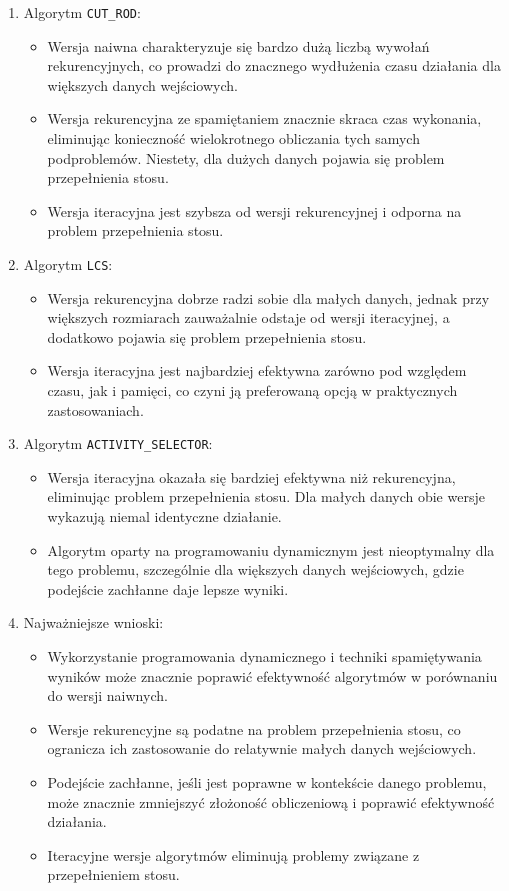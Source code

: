 \documentclass{article}
\begin{document}
\begin{enumerate}
    \item Algorytm \texttt{CUT\_ROD}:
    \begin{itemize}
        \item Wersja naiwna charakteryzuje się bardzo dużą liczbą wywołań rekurencyjnych, co prowadzi do znacznego wydłużenia czasu działania dla większych danych wejściowych.
        \item Wersja rekurencyjna ze spamiętaniem znacznie skraca czas wykonania, eliminując konieczność wielokrotnego obliczania tych samych podproblemów. Niestety, dla dużych danych pojawia się problem przepełnienia stosu.
        \item Wersja iteracyjna jest szybsza od wersji rekurencyjnej i odporna na problem przepełnienia stosu.
    \end{itemize}

    \item Algorytm \texttt{LCS}:
    \begin{itemize}
        \item Wersja rekurencyjna dobrze radzi sobie dla małych danych, jednak przy większych rozmiarach zauważalnie odstaje od wersji iteracyjnej, a dodatkowo pojawia się problem przepełnienia stosu.
        \item Wersja iteracyjna jest najbardziej efektywna zarówno pod względem czasu, jak i pamięci, co czyni ją preferowaną opcją w praktycznych zastosowaniach.
    \end{itemize}

    \item Algorytm \texttt{ACTIVITY\_SELECTOR}:
    \begin{itemize}
        \item Wersja iteracyjna okazała się bardziej efektywna niż rekurencyjna, eliminując problem przepełnienia stosu. Dla małych danych obie wersje wykazują niemal identyczne działanie.
        \item Algorytm oparty na programowaniu dynamicznym jest nieoptymalny dla tego problemu, szczególnie dla większych danych wejściowych, gdzie podejście zachłanne daje lepsze wyniki.
    \end{itemize}

    \item Najważniejsze wnioski:
    \begin{itemize}
        \item Wykorzystanie programowania dynamicznego i techniki spamiętywania wyników może znacznie poprawić efektywność algorytmów w porównaniu do wersji naiwnych.
        \item Wersje rekurencyjne są podatne na problem przepełnienia stosu, co ogranicza ich zastosowanie do relatywnie małych danych wejściowych.
        \item Podejście zachłanne, jeśli jest poprawne w kontekście danego problemu, może znacznie zmniejszyć złożoność obliczeniową i poprawić efektywność działania.
        \item Iteracyjne wersje algorytmów eliminują problemy związane z przepełnieniem stosu.
    \end{itemize}
\end{enumerate}
\end{document}
